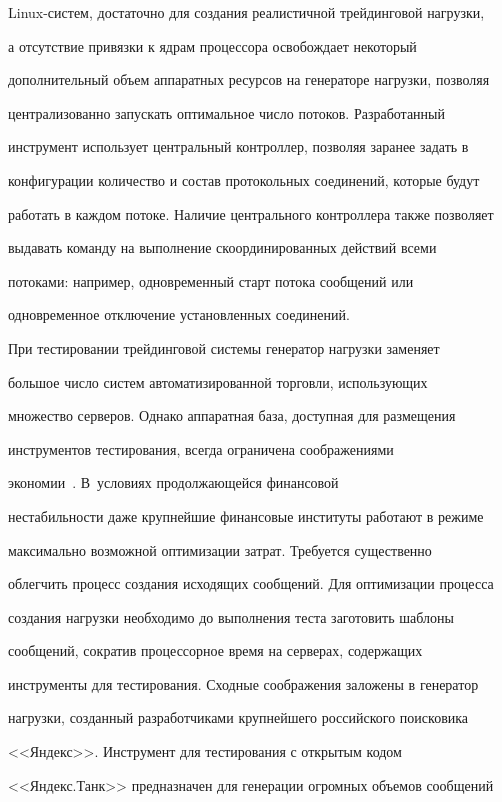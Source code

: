Linux-сис\-тем, достаточно для создания реалистичной трейдинговой нагрузки,


а отсутствие привязки к ядрам процессора освобождает некоторый


дополнительный объем аппаратных ресурсов на генераторе нагрузки, позволяя


централизованно запускать оптимальное число потоков. Разработанный


инструмент использует центральный контроллер, позволяя заранее задать в


конфигурации количество и состав протокольных соединений, которые будут


работать в каждом потоке. Наличие центрального контроллера также позволяет


выдавать команду на выполнение скоординированных действий всеми


потоками: например, одновременный старт потока сообщений или


одновременное отключение установленных соединений.





  При тестировании трейдинговой системы генератор нагрузки заменяет


большое число систем автоматизированной торговли, использующих


множество серверов. Однако аппаратная база, доступная для размещения


инструментов тестирова\-ния, всегда ограничена соображениями


экономии~\cite{13-g}. В~условиях продолжающейся финансовой


нестабильности даже крупнейшие финансовые институты работают в режиме


максимально возможной оптимизации затрат. Требуется существенно


облегчить процесс создания исходящих сообщений. Для оптимизации процесса


создания нагрузки необходимо до выполнения теста заготовить шаблоны


сообщений, сократив процессорное время на серверах, содержащих


инструменты для тестирования. Сходные соображения заложены в генератор


нагрузки, созданный разработчиками крупнейшего российского поисковика


<<Яндекс>>. Инструмент для тестирования с открытым кодом


<<Яндекс.Танк>> предназначен для генерации огромных объемов сообщений


